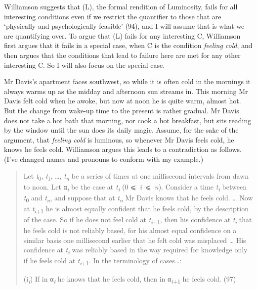 \documentclass[
  11pt,
  letterpaper,
  DIV=11,
  numbers=noendperiod,
  twoside]{scrartcl}
\renewcommand{\textsc}[1]{{\scfont #1}}
\begin{document}
Williamson suggests that (L), the formal rendition of Luminosity, fails
for all interesting conditions even if we restrict the quantifier to
those that are `physically and psychologically feasible' (94), and I
will assume that is what we are quantifying over. To argue that (L)
fails for any interesting C, Williamson first argues that it fails in a
special case, when C is the condition \emph{feeling cold}, and then
argues that the conditions that lead to failure here are met for any
other interesting C. So I will also focus on the special case.

Mr Davis's apartment faces southwest, so while it is often cold in the
mornings it always warms up as the midday and afternoon sun streams in.
This morning Mr Davis felt cold when he awoke, but now at noon he is
quite warm, almost hot. But the change from wake-up time to the present
is rather gradual. Mr Davis does not take a hot bath that morning, nor
cook a hot breakfast, but sits reading by the window until the sun does
its daily magic. Assume, for the sake of the argument, that
\emph{feeling cold} is luminous, so whenever Mr Davis feels cold, he
knows he feels cold. Williamson argues this leads to a contradiction as
follows. (I've changed names and pronouns to conform with my example.)

\begin{quote}
Let \emph{t}\textsubscript{0}, \emph{t}\textsubscript{1}, \ldots,
\emph{t\textsubscript{n}} be a series of times at one millisecond
intervals from dawn to noon. Let α\textsubscript{\emph{i}} be the case
at \emph{t\textsubscript{i}} (0 ⩽~\emph{i}~⩽~\emph{n}). Consider a time
\emph{t\textsubscript{i}} between \emph{t}\textsubscript{0} and
\emph{t\textsubscript{n}}, and suppose that at \emph{t\textsubscript{n}}
Mr Davis knows that he feels cold. \ldots{} Now at
\emph{t\textsubscript{i}}\textsubscript{+1} he is almost equally
confident that he feels cold, by the description of the case. So if he
does not feel cold at \emph{t\textsubscript{i}}\textsubscript{+1}, then
his confidence at \emph{t\textsubscript{i}} that he feels cold is not
reliably based, for his almost equal confidence on a similar basis one
millisecond earlier that he felt cold was misplaced \ldots{} His
confidence at \emph{t\textsubscript{i}} was reliably based in the way
required for knowledge only if he feels cold at
\emph{t\textsubscript{i}}\textsubscript{+1}. In the terminology of
cases\ldots:

(\textsc{i}\textsubscript{\emph{i}}) If in α\textsubscript{\emph{i}} he
knows that he feels cold, then in α\textsubscript{\emph{i}+1} he feels
cold. (97)
\end{quote}
\end{document}
